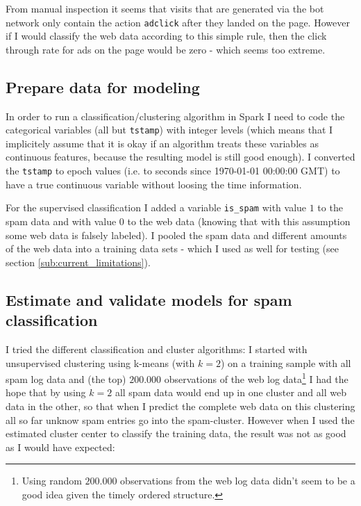 \documentclass{article}\usepackage[]{graphicx}\usepackage[]{color}
\begin{document}
From manual inspection it seems that visits that are generated via the bot network only contain the action \verb+adclick+ after they landed on the page. However if I would classify the web data according to this simple rule, then the click through rate for ads on the page would be zero - which seems too extreme.


\subsection{Prepare data for modeling} %
\label{sub:prepare_data_for_modeling}
In order to run a classification/clustering algorithm in Spark I need to code the categorical variables (all but \verb+tstamp+) with integer levels (which means that I implicitely assume that it is okay if an algorithm treats these variables as continuous features, because the resulting model is still good enough).
I converted the \verb+tstamp+ to epoch values (i.e. to seconds since 1970-01-01 00:00:00 GMT) to have a true continuous variable without loosing the time information.

For the supervised classification I added a variable \verb+is_spam+ with value $1$ to the spam data and with value 0 to the web data (knowing that with this assumption some web data is falsely labeled). I pooled the spam data and different amounts of the web data into a training data sets - which I used as well for testing (see section \ref{sub:current_limitations}).


\subsection{Estimate and validate models for spam classification} %
\label{sub:estimate_and_validate_models_for_spam_classification}
I tried the different classification and cluster algorithms: I started with unsupervised clustering using k-means (with $k=2$) on a training sample with all spam log data and (the top) $200.000$ observations of the web log data\footnote{Using random $200.000$ observations from the web log data didn't seem to be a good idea given the timely ordered structure.} I had the hope that by using $k=2$ all spam data would end up in one cluster and all web data in the other, so that when I predict the complete web data on this clustering all so far unknow spam entries go into the spam-cluster. However when I used the estimated cluster center to classify the training data, the result was not as good as I would have expected:
\end{document}
